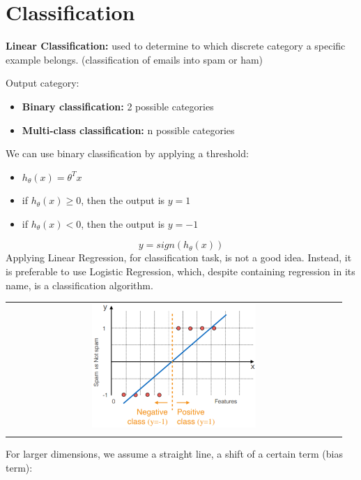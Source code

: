 \section{Classification}

\begin{mdframed}
    \textbf{Linear Classification:} used to determine to which discrete category a specific example belongs. (classification of emails into spam or ham)
\end{mdframed}
Output category:
\begin{itemize}
    \item \textbf{Binary classification:} 2 possible categories
    \item \textbf{Multi-class classification:} n possible categories
\end{itemize}
We can use binary classification by applying a threshold:
\begin{itemize}
    \item $h_\theta(x) = \theta^Tx$
    \item if $h_\theta(x) \geq 0$, then the output is $y = 1$
    \item if $h_\theta(x) < 0$, then the output is $y = -1$
\end{itemize}
\begin{equation} \tag{Classification}
    y = sign(h_\theta(x))
\end{equation}
Applying Linear Regression, for classification task, is not a good idea. Instead, it is preferable to use Logistic Regression, which, despite containing regression in its name, is a classification algorithm.
\begin{center}
    \begin{tabular}{c}
        \\ \includegraphics[width=0.5\textwidth]{images/Classification1.png} \\ \\
    \end{tabular}
\end{center}
For larger dimensions, we assume a straight line, a shift of a certain term (bias term):
